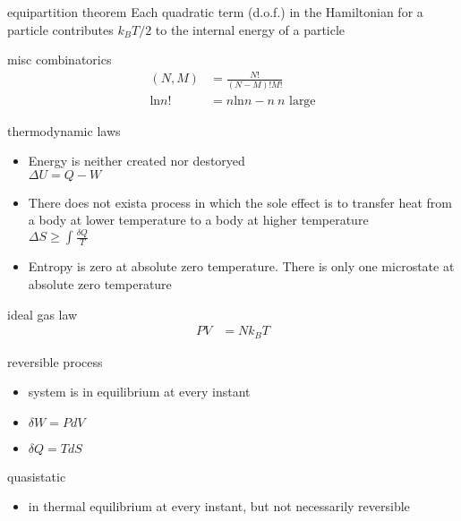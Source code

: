 \documentclass[avery5388, frame, grid]{flashcards}
\begin{document}
\begin{flashcard}{equipartition theorem}
  Each quadratic term (d.o.f.) in the Hamiltonian for a particle contributes $k_{B} T / 2$
  to the internal energy of a particle
\end{flashcard}

\begin{flashcard}{misc combinatorics}
  {
    \begin{align*}
      (N, M) &= \frac{N!}{(N - M)! M!}\\
      \textrm{ln} n! &= n \textrm{ln} n - n \ \textrm{$n$ large}
    \end{align*}
  }
\end{flashcard}

\begin{flashcard}{thermodynamic laws}
  \begin{itemize}
  \item Energy is neither created nor destoryed\\
    $\Delta U = Q - W$
  \item There does not exista  process in which the sole effect is to transfer heat from a
    body at lower temperature to a body at higher temperature\\
    $\Delta S \ge \int \frac{\delta Q}{T}$
  \item Entropy  is zero at absolute zero temperature. There is only one microstate at absolute
    zero temperature
  \end{itemize}
\end{flashcard}

\begin{flashcard}{ideal gas law}
  {
    \begin{align*}
      P V &= N k_{B} T
    \end{align*}
  }
\end{flashcard}

\begin{flashcard}{reversible process}
  \begin{itemize}
  \item system is in equilibrium at every instant
  \item $\delta W = P dV$
  \item $\delta Q = T dS$
  \end{itemize}
\end{flashcard}

\begin{flashcard}{quasistatic}
  \begin{itemize}
  \item in thermal equilibrium at every instant, but not necessarily reversible
  \end{itemize}
\end{flashcard}
\end{document}
